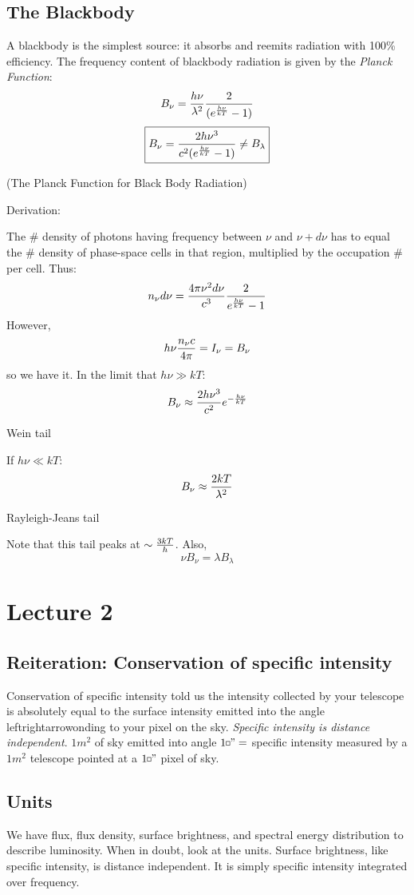 \documentclass[11pt]{article}
\def\sqr#1#2{{\vcenter{\vbox{\hrule height.#2pt
    \hbox{\vrule width.#2pt height#1pt \kern#1pt
        \vrule width.#2pt}
    \hrule height.#2pt}}}}
\def\square{\mathchoice\sqr34\sqr34\sqr{2.1}3\sqr{1.5}3}
\begin{document}
\subsection*{ The Blackbody }

A blackbody is the simplest source: it absorbs and reemits radiation with
100\% efficiency.  The frequency content of blackbody radiation is given by
the {\it Planck Function}:
\def\ehv{e^{{h\nu \over kT}}}
$$B_\nu={h\nu\over\lambda^2}{2\over(\ehv-1)}$$
$$\boxed{B_\nu={2h\nu^3\over c^2(\ehv-1)}\ne B_\lambda}$$
\centerline{(The Planck Function for Black Body Radiation)}\par

Derivation:\par
The \# density of photons having frequency between $\nu$ and $\nu+d\nu$ has
to equal the \# density of phase-space cells in that region, multiplied by
the occupation \# per cell.  Thus:
$$n_\nu d\nu={4\pi\nu^2d\nu\over c^3}{2\over\ehv-1}$$
However,
$$h\nu{n_\nu c\over 4\pi}=I_\nu=B_\nu$$
so we have it.  In the limit that $h\nu\gg kT$:
$$B_\nu\approx{2h\nu^3\over c^2}e^{-{h\nu\over kT}}$$
\centerline{Wein tail}\par
If $h\nu\ll kT$:
$$B_\nu\approx{2kT\over\lambda^2}$$
\centerline{Rayleigh-Jeans tail}
Note that this tail peaks at $\sim {3kT\over h}$. Also,
$$\nu B_\nu=\lambda B_\lambda$$

\section*{ Lecture 2}

\subsection*{ Reiteration: Conservation of specific intensity }

Conservation of specific intensity told us the intensity collected by your
telescope is absolutely equal to the surface intensity emitted into the angle
leftrightarrowonding to your pixel on the sky. {\it Specific intensity is
distance independent}.
$1 m^2$ of sky emitted into angle $1\square " =$ specific intensity
measured by a $1m^2$ telescope pointed at a $1\square "$ pixel of sky.

\subsection*{ Units}

We have flux, flux density, surface brightness, and spectral energy 
distribution to describe luminosity.  When in doubt, look at the units.
Surface brightness, like specific intensity, is distance independent. It is
simply specific intensity integrated over frequency.
\end{document}
